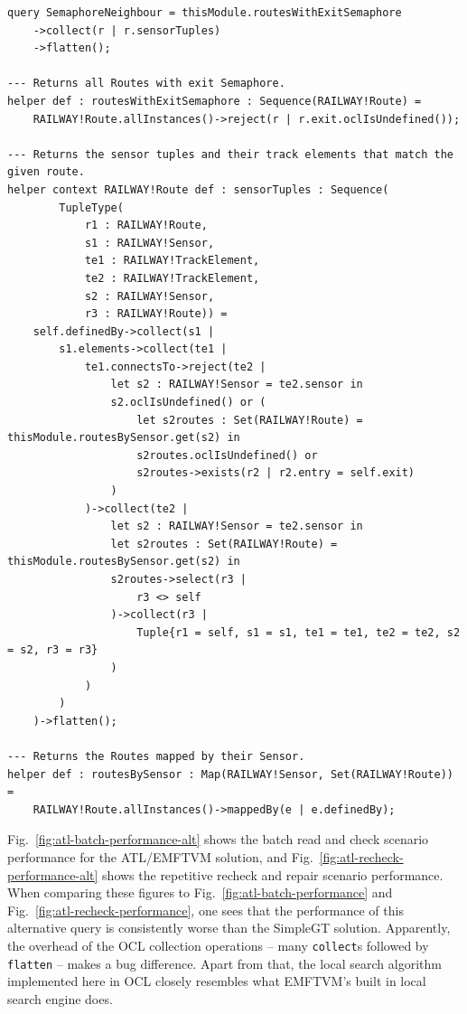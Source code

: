 \documentclass[submission,copyright,creativecommons]{eptcs}
\begin{document}
\lstset{language=atl}
\begin{lstlisting}[float=htb, caption={SemaphoreNeighbor query in ATL}, label=lst:semaphoreneighbor, captionpos=b, frame=tb, belowskip=-10pt]
query SemaphoreNeighbour = thisModule.routesWithExitSemaphore
	->collect(r | r.sensorTuples)
	->flatten();

--- Returns all Routes with exit Semaphore.
helper def : routesWithExitSemaphore : Sequence(RAILWAY!Route) =
	RAILWAY!Route.allInstances()->reject(r | r.exit.oclIsUndefined());

--- Returns the sensor tuples and their track elements that match the given route.
helper context RAILWAY!Route def : sensorTuples : Sequence(
		TupleType(
			r1 : RAILWAY!Route,
			s1 : RAILWAY!Sensor, 
			te1 : RAILWAY!TrackElement, 
			te2 : RAILWAY!TrackElement, 
			s2 : RAILWAY!Sensor,
			r3 : RAILWAY!Route)) =
	self.definedBy->collect(s1 | 
		s1.elements->collect(te1 | 
			te1.connectsTo->reject(te2 | 
				let s2 : RAILWAY!Sensor = te2.sensor in
				s2.oclIsUndefined() or (
					let s2routes : Set(RAILWAY!Route) = thisModule.routesBySensor.get(s2) in
					s2routes.oclIsUndefined() or
					s2routes->exists(r2 | r2.entry = self.exit)
				)
			)->collect(te2 |
				let s2 : RAILWAY!Sensor = te2.sensor in
				let s2routes : Set(RAILWAY!Route) = thisModule.routesBySensor.get(s2) in
				s2routes->select(r3 |
					r3 <> self
				)->collect(r3 |
					Tuple{r1 = self, s1 = s1, te1 = te1, te2 = te2, s2 = s2, r3 = r3}
				)
			)
		)
	)->flatten();

--- Returns the Routes mapped by their Sensor.
helper def : routesBySensor : Map(RAILWAY!Sensor, Set(RAILWAY!Route)) =
	RAILWAY!Route.allInstances()->mappedBy(e | e.definedBy);
\end{lstlisting}

Fig.~\ref{fig:atl-batch-performance-alt} shows the batch read and check scenario performance for the ATL/EMFTVM solution, and Fig.~\ref{fig:atl-recheck-performance-alt} shows the repetitive recheck and repair scenario performance. When comparing these figures to Fig.~\ref{fig:atl-batch-performance} and Fig.~\ref{fig:atl-recheck-performance}, one sees that the performance of this alternative query is consistently worse than the SimpleGT solution. Apparently, the overhead of the OCL collection operations -- many \texttt{collect}s followed by \texttt{flatten} -- makes a bug difference. Apart from that, the local search algorithm implemented here in OCL closely resembles what EMFTVM's built in local search engine does.
\end{document}
